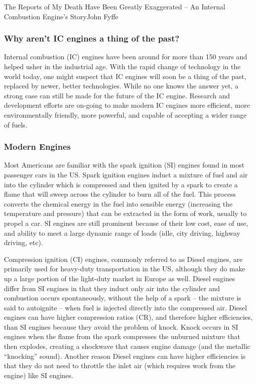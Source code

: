 \documentclass{papertex}
\begin{document}
\begin{news}{2}{The Reports of My Death Have Been Greatly Exaggerated -- An Internal Combustion Engine’s Story}{John Fyffe}{}{}

\subsubsection*{Why aren’t IC engines a thing of the past?}

Internal combustion (IC) engines have been around for more than 150 years and 
helped usher in the industrial age.  With the rapid change of technology in 
the world today, one might suspect that IC engines will soon be a thing of 
the past, replaced by newer, better technologies.  While no one knows the 
answer yet, a strong case can still be made for the future of the IC engine.  
Research and development efforts are on-going to make modern IC engines more 
efficient, more environmentally friendly, more powerful, and capable of 
accepting a wider range of fuels.

\subsubsection*{Modern Engines}

Most Americans are familiar with the spark ignition (SI) engines found in most 
passenger cars in the US.  Spark ignition engines induct a mixture of fuel and 
air into the cylinder which is compressed and then ignited by a spark to create 
a flame that will sweep across the cylinder to burn all of the fuel.  This 
process converts the chemical energy in the fuel into sensible energy 
(increasing the temperature and pressure) that can be extracted in the form 
of work, usually to propel a car.  SI engines are still prominent because of 
their low cost, ease of use, and ability to meet a large dynamic range of 
loads (idle, city driving, highway driving, etc).

Compression ignition (CI) engines, commonly referred to as Diesel engines, 
are primarily used for heavy-duty transportation in the US, although they 
do make up a large portion of the light-duty market in Europe as well.  
Diesel engines differ from SI engines in that they induct only air into 
the cylinder and combustion occurs spontaneously, without the help of a 
spark – the mixture is said to autoignite – when fuel is injected directly 
into the compressed air.  Diesel engines can have higher compression ratios 
(CR), and therefore higher efficiencies, than SI engines because they avoid 
the problem of knock.  Knock occurs in SI engines when the flame from the 
spark compresses the unburned mixture that then explodes, creating a shockwave 
that causes engine damage (and the metallic “knocking” sound).  Another reason 
Diesel engines can have higher efficiencies is that they do not need to 
throttle the inlet air (which requires work from the engine) like SI engines.


\end{news}
\end{document}
